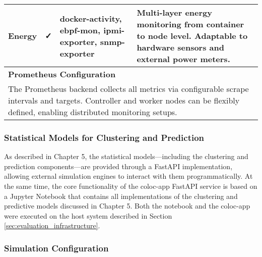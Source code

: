 \begin{table}[H]
{\begin{tabular}{
            p{3.5cm}
            >{\centering\arraybackslash}p{2cm}
            p{5cm}
            p{6cm}
            }
            Energy                     & ✓                & docker-activity, ebpf-mon, ipmi-exporter, snmp-exporter & Multi-layer energy monitoring from container to node level. Adaptable to hardware sensors and external power meters.    \\

            \midrule
            \multicolumn{4}{l}{\textbf{Prometheus Configuration}}                                                                                                                                                                             \\[3pt]
            \multicolumn{4}{p{16.5cm}}{
                The Prometheus backend collects all metrics via configurable scrape intervals and targets. Controller and worker nodes can be flexibly defined, enabling distributed monitoring setups.
            }                                                                                                                                                                                                                                 \\

            \bottomrule
        \end{tabular}
    }
\end{table}

\subsubsection{Statistical Models for Clustering and Prediction}
\label{sec:evaluation_statistical_learning_methods}
As described in Chapter 5, the statistical models—including the clustering and prediction components—are provided through a FastAPI implementation, allowing external simulation engines to interact with them programmatically. At the same time, the core functionality of the coloc-app FastAPI service is based on a Jupyter Notebook that contains all implementations of the clustering and predictive models discussed in Chapter 5. Both the notebook and the coloc-app were executed on the host system described in Section \ref{sec:evaluation_infrastructure}.

\subsubsection{Simulation Configuration}
\label{sec:evaluation_simulation_configuration}

